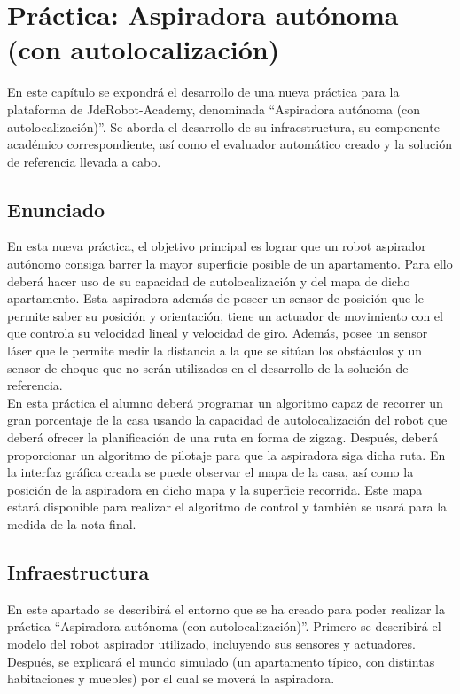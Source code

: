 \chapter{Práctica: Aspiradora autónoma (con autolocalización)}\label{cap.roomba}
En este capítulo se expondrá el desarrollo de una nueva práctica para la plataforma de JdeRobot-Academy, denominada ``Aspiradora autónoma (con autolocalización)''. Se aborda el desarrollo de su infraestructura, su componente académico correspondiente, así como el evaluador automático creado y la solución de referencia llevada a cabo. 


\section{Enunciado} \label{sec.enunciado}
En esta nueva práctica, el objetivo principal es lograr que un robot aspirador autónomo consiga barrer la mayor superficie posible de un apartamento. Para ello deberá hacer uso de su capacidad de autolocalización y del mapa de dicho apartamento. Esta aspiradora además de poseer un sensor de posición que le permite saber su posición y orientación, tiene un actuador de movimiento con el que controla su velocidad lineal y velocidad de giro. Además, posee un sensor láser que le permite medir la distancia a la que se sitúan los obstáculos y un sensor de choque que no serán utilizados en el desarrollo de la solución de referencia. \\

En esta práctica el alumno deberá programar un algoritmo capaz de recorrer un gran porcentaje de la casa usando la capacidad de autolocalización del robot que deberá ofrecer la planificación de una ruta en forma de zigzag. Después, deberá proporcionar un algoritmo de pilotaje para que la aspiradora siga dicha ruta. En la interfaz gráfica creada se puede observar el mapa de la casa, así como la posición de la aspiradora en dicho mapa y la superficie recorrida. Este mapa estará disponible para realizar el algoritmo de control y también se usará para la medida de la nota final.


\section{Infraestructura} 
En este apartado se describirá el entorno que se ha creado para poder realizar la práctica ``Aspiradora autónoma (con autolocalización)''. Primero se describirá el modelo del robot aspirador utilizado, incluyendo sus sensores y actuadores. Después, se explicará el mundo simulado (un apartamento típico, con distintas habitaciones y muebles) por el cual se moverá la aspiradora. 

